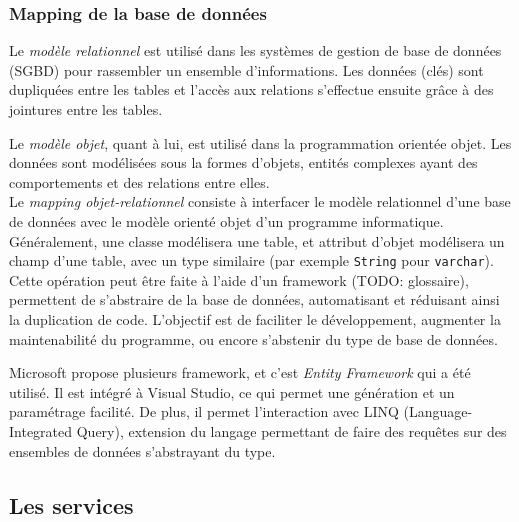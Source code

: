 
\subsubsection{Mapping de la base de données}

Le \textit{modèle relationnel} est utilisé dans les systèmes de gestion de base de données (SGBD) pour rassembler un ensemble d'informations. Les données (clés) sont dupliquées entre les tables et l'accès aux relations s'effectue ensuite grâce à des jointures entre les tables.

Le \textit{modèle objet}, quant à lui, est utilisé dans la programmation orientée objet. Les données sont modélisées sous la formes d'objets, entités complexes ayant des comportements et des relations entre elles.
\\

Le \textit{mapping objet-relationnel} consiste à interfacer le modèle relationnel d'une base de données avec le modèle orienté objet d'un programme informatique. Généralement, une classe modélisera une table, et attribut d'objet modélisera un champ d'une table, avec un type similaire (par exemple \lstinline{String} pour \lstinline{varchar}).
\\

Cette opération peut être faite à l'aide d'un framework (TODO: glossaire), permettent de s'abstraire de la base de données, automatisant et réduisant ainsi la duplication de code. L'objectif est de faciliter le développement, augmenter la maintenabilité du programme, ou encore s'abstenir du type de base de données.

Microsoft propose plusieurs framework, et c'est \textit{Entity Framework} qui a été utilisé. Il est intégré à Visual Studio, ce qui permet une génération et un paramétrage facilité. De plus, il permet l'interaction avec  LINQ (Language-Integrated Query), extension du langage permettant de faire des requêtes sur des ensembles de données s'abstrayant du type.


\subsection{Les services}

